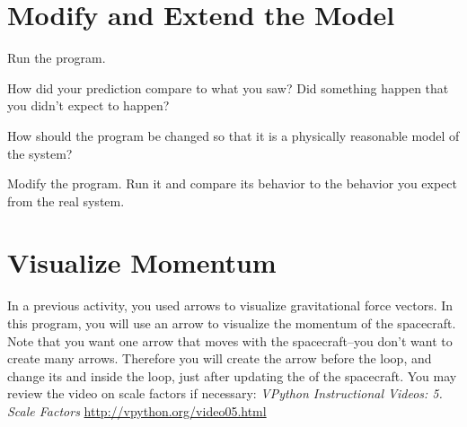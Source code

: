 \documentclass[11pt]{article}
\begin{document}

\section{Modify and Extend the Model}

\begin{compactitem}[\color{MIRed}$\Rightarrow$]
\item Run the program.   
\item How did your prediction compare to what you saw? Did something happen that you didn't expect to happen?
\item How should the program be changed so that it is a physically reasonable model of the system?
\item Modify the program.  Run it and compare its behavior to the behavior you expect from the real system.
\end{compactitem}


\section{Visualize Momentum}

In a previous activity, you used arrows to visualize gravitational force vectors. In this program, you will use an arrow to visualize the momentum of the spacecraft.  Note that you want one arrow that moves with the spacecraft--you don't want to create many arrows.  Therefore you will create the arrow before the loop, and change its  and  inside the loop, just after updating the  of the spacecraft.  You may review the video on scale factors if necessary: \textit{VPython Instructional Videos: 5. Scale Factors } \url{http://vpython.org/video05.html}\\
\end{document}
